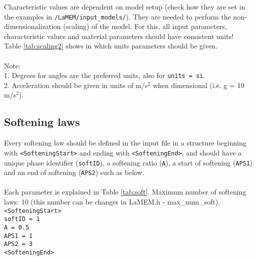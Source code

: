 \documentclass[a4paper,11pt]{article}
\newcommand{\reftab}{Table \ref}
\begin{document}
Characteristic values are dependent on model setup (check how they are set in the examples in \texttt{/LaMEM/input\_models/}). They are needed to perform the non-dimensionalization (scaling) of the model. For this, all input parameters, characteristic values and material parameters should have consistent units!\\

\reftab{tab:scaling2} shows in which units parameters should be given. \\
\\
Note: \\
1. Degrees for angles are the preferred units, also for \texttt{units = si}. \\
2. Acceleration should be given in units of m/s$^2$ when dimensional (i.e. g = 10 m/s$^2$).

\newpage
\subsection{Softening laws}
\label{sec:softlaws}

Every softening law should be defined in the input file in a structure beginning with \texttt{<SofteningStart>} and ending with \texttt{<SofteningEnd>}, and should have a unique phase identifier (\texttt{softID}), a softening ratio (\texttt{A}), a start of softening (\texttt{APS1}) and an end of softening (\texttt{APS2}) such as below. \\
\\
Each parameter is explained in \reftab{tab:soft}. Maximum number of softening laws: 10 (this number can be changes in LaMEM.h - max\_num\_soft).\\

\indent \texttt{<SofteningStart>}\\
\indent \indent \texttt{softID = 1}\\
\indent \indent \texttt{A \hspace{2.7pc}= 0.5}\\
\indent \indent \texttt{APS1 \hspace{0.5pc} = 1}\\
\indent \indent \texttt{APS2 \hspace{0.5pc} = 3}\\
\indent \texttt{<SofteningEnd>}\\
\end{document}
